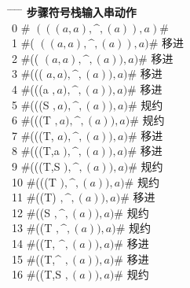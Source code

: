 \documentclass{article}
\begin{document}
\begin{tabbing}
    \hspace{1.5cm} \= \hspace{3cm} \= \hspace{5cm} \= \hspace{1.5cm} \= \kill
    \textbf{步骤}\>\textbf{符号栈}\>\textbf{输入串}\>\textbf{动作}\\
    0\> \#  \> $(((a,a),\^{},(a)),a)\#$ \>  \\
    
    1\> \#( \> $((a,a),\^{},(a)),a)\#$ \> 移进 \\
    
    2\> \#(( \> $(a,a),\^{},(a)),a)\#$ \> 移进 \\
    
    3\> \#((( \> $a,a),\^{},(a)),a)\#$ \> 移进 \\
    
    4\> \#(((a \> $,a),\^{},(a)),a)\#$ \> 移进 \\
    
    5\> \#(((S \> $,a),\^{},(a)),a)\#$ \> 规约 \\
    
    6\> \#(((T \> $,a),\^{},(a)),a)\#$ \> 规约 \\
    
    7\> \#(((T, \> $a),\^{},(a)),a)\#$ \> 移进 \\
    
    8\> \#(((T,a \> $),\^{},(a)),a)\#$ \> 移进 \\
    
    9\> \#(((T,S \> $),\^{},(a)),a)\#$ \> 规约 \\
    
    10\> \#(((T \> $),\^{},(a)),a)\#$ \> 规约 \\
    
    11\> \#((T) \> $,\^{},(a)),a)\#$ \> 移进 \\
    
    12\> \#((S \> $,\^{},(a)),a)\#$ \> 规约 \\
    
    13\> \#((T \> $,\^{},(a)),a)\#$ \> 规约 \\
    
    14\> \#((T, \> $\^{},(a)),a)\#$ \> 移进 \\
    
    15\> \#((T,\^{} \> $,(a)),a)\#$ \> 移进 \\
    
    16\> \#((T,S \> $,(a)),a)\#$ \> 规约 \\
    

\end{tabbing}
\end{document}
